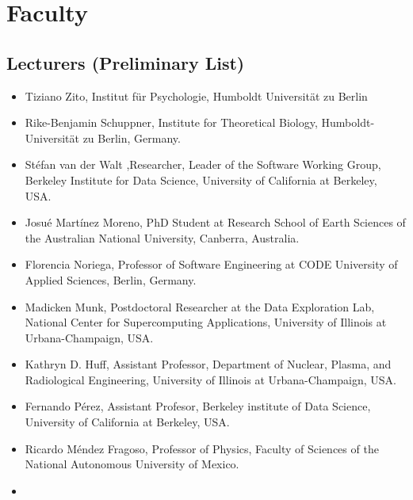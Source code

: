 \documentclass{article}[11pt]
\begin{document}
\section*{Faculty}

\subsection*{Lecturers (Preliminary List)}
\begin{itemize}
    \item Tiziano Zito, Institut f\"ur Psychologie, Humboldt Universit\"at zu Berlin    \item Rike-Benjamin Schuppner, Institute for Theoretical Biology, Humboldt-Universit\"at zu Berlin, Germany.
    \item St\'efan van der Walt ,Researcher, Leader of the Software Working Group, Berkeley Institute for Data Science, University of California at Berkeley, USA.
    \item Josu\'e Mart\'inez Moreno, PhD Student at Research School of Earth Sciences of the Australian National University, Canberra, Australia.
    \item  Florencia Noriega, Professor of Software Engineering at CODE University of Applied Sciences, Berlin, Germany.
   \item Madicken Munk, Postdoctoral Researcher at the  Data Exploration Lab, National Center for Supercomputing Applications, University of Illinois at Urbana-Champaign, USA.
 \item Kathryn D. Huff, Assistant Professor, Department of Nuclear, Plasma, and Radiological Engineering, University of Illinois at Urbana-Champaign, USA.
  \item Fernando P\'erez, Assistant Profesor, Berkeley institute of Data Science, University of California at Berkeley, USA.
\item Ricardo M\'endez Fragoso, Professor of Physics, Faculty of Sciences of the National Autonomous University of Mexico.
    \item {}
\end{itemize}
\end{document}
